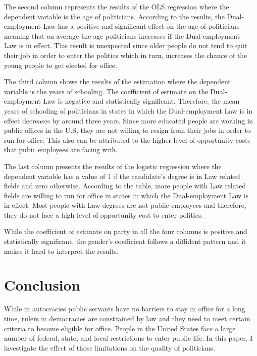 \documentclass[12pt,english]{article}
\begin{document}
The second column represents the results of the OLS regression where the dependent variable is the age of politicians. According to the results, the Dual-employment Law has a positive and significant effect on the age of politicians meaning that on average the age politicians increases if the Dual-employment Law is in effect. This result is unexpected since older people do not tend to quit their job in order to enter the politics which in turn, increases the chance of the young people to get elected for office.

The third column shows the results of the estimation where the dependent variable is the years of schooling. The coefficient of estimate on the Dual-employment Law is negative and  statistically significant. Therefore, the mean years of schooling of politicians in states in which the Dual-employment Law is in effect decreases by around three years. Since more educated people are working in public offices in the U.S, they are not willing to resign from their jobs in order to run for office. This also can be attributed to the higher level of opportunity costs that   pubic employees are facing with. 

The last column presents the results of the logistic regression where the dependent variable has a value of 1 if the candidate's degree is in Law related fields and zero otherwise. According to the table, more people with Law related fields are willing to run for office in states in which the Dual-employment Law is in effect. Most people with Law degrees are not public employees and therefore, they do not face a high level of opportunity cost to enter politics. 

While the coefficient of estimate on party in all the four columns is positive and statistically significant, the gender's coefficient follows a diffident pattern and it makes it hard to interpret the results. 




\section{Conclusion}\label{sec:conclusion}


While in autocracies public servants have no barriers to stay in office for a long time, rulers in democracies are constrained by law and they need to meet certain criteria to become eligible for office.
People in the United States face a large number of federal, state, and local restrictions to enter public life. In this paper, I investigate the effect of those limitations on the
quality of politicians.
\end{document}
